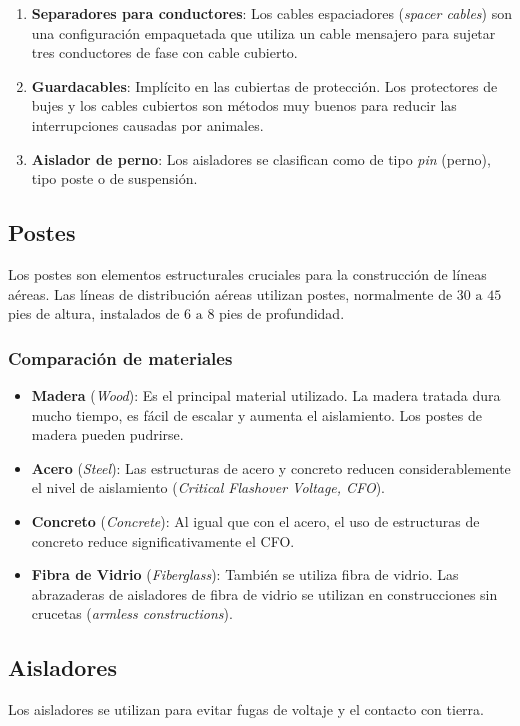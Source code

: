 \begin{enumerate}
    \item \textbf{Separadores para conductores}: Los cables espaciadores (\textit{spacer cables}) son una configuración empaquetada que utiliza un cable mensajero para sujetar tres conductores de fase con cable cubierto.
    \item \textbf{Guardacables}: Implícito en las cubiertas de protección. Los protectores de bujes y los cables cubiertos son métodos muy buenos para reducir las interrupciones causadas por animales.
    \item \textbf{Aislador de perno}: Los aisladores se clasifican como de tipo \textit{pin} (perno), tipo poste o de suspensión.
\end{enumerate}

\subsection*{Postes}
Los postes son elementos estructurales cruciales para la construcción de líneas aéreas. Las líneas de distribución aéreas utilizan postes, normalmente de $30 \text{ a } 45$ pies de altura, instalados de $6 \text{ a } 8$ pies de profundidad.

\subsubsection*{Comparación de materiales}
\begin{itemize}
    \item \textbf{Madera} (\textit{Wood}): Es el principal material utilizado. La madera tratada dura mucho tiempo, es fácil de escalar y aumenta el aislamiento. Los postes de madera pueden pudrirse.
    \item \textbf{Acero} (\textit{Steel}): Las estructuras de acero y concreto reducen considerablemente el nivel de aislamiento (\textit{Critical Flashover Voltage, CFO}).
    \item \textbf{Concreto} (\textit{Concrete}): Al igual que con el acero, el uso de estructuras de concreto reduce significativamente el CFO.
    \item \textbf{Fibra de Vidrio} (\textit{Fiberglass}): También se utiliza fibra de vidrio. Las abrazaderas de aisladores de fibra de vidrio se utilizan en construcciones sin crucetas (\textit{armless constructions}).
\end{itemize}

\subsection*{Aisladores}
Los aisladores se utilizan para evitar fugas de voltaje y el contacto con tierra.

